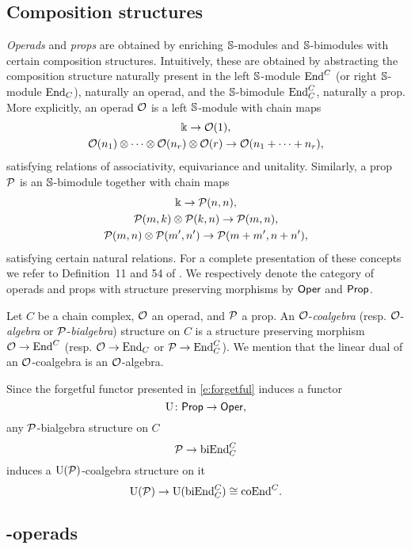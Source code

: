 \subsection{Composition structures}

\textit{Operads} and \textit{props} are obtained by enriching $\mathbb{S}$-modules and $\mathbb{S}$-bimodules with certain composition structures.
Intuitively, these are obtained by abstracting the composition structure naturally present in the left $\mathbb{S}$-module $\mathrm{End}^C$ (or right $\mathbb{S}$-module $\mathrm{End}_C$), naturally an operad, and the $\mathbb{S}$-bimodule $\mathrm{End}^C_C$, naturally a prop.
More explicitly, an operad $\mathcal{O}$ is a left $\mathbb{S}$-module with chain maps
\begin{gather*}
	\Bbbk \to \mathcal{O}(1), \\
	\mathcal{O}(n_1) \otimes \dotsb \otimes \mathcal{O}(n_r) \otimes \mathcal{O}(r) \to \mathcal{O}(n_1 + \dots + n_r),
\end{gather*}
satisfying relations of associativity, equivariance and unitality.
Similarly, a prop $\mathcal{P}$ is an $\mathbb{S}$-bimodule together with chain maps
\begin{gather*}
	\Bbbk \to \mathcal{P}(n,n), \\
	\mathcal{P}(m,k) \otimes \mathcal{P}(k,n) \to \mathcal{P}(m,n), \\
	\mathcal{P}(m,n) \otimes \mathcal{P}(m',n') \to \mathcal{P}(m+m',n+n'),
\end{gather*}
satisfying certain natural relations.
For a complete presentation of these concepts we refer to Definition~11 and 54 of \cite{markl2008props}.
We respectively denote the category of operads and props with structure preserving morphisms by $\mathsf{Oper}$ and $\mathsf{Prop}$.

Let $C$ be a chain complex, $\mathcal{O}$ an operad, and $\mathcal{P}$ a prop.
An $\mathcal{O}$-\textit{coalgebra} (resp. $\mathcal{O}$-\textit{algebra} or $\mathcal{P}$-\textit{bialgebra}) structure on $C$ is a structure preserving morphism $\mathcal{O} \to \mathrm{End}^C$ (resp. $\mathcal{O} \to \mathrm{End}_C$ or $\mathcal{P} \to \mathrm{End}_C^C$).
We mention that the linear dual of an $\mathcal{O}$-coalgebra is an $\mathcal{O}$-algebra.

Since the forgetful functor presented in \cref{e:forgetful} induces a functor
\[
\operatorname{U} \colon \mathsf{Prop} \to \mathsf{Oper},
\]
any $\mathcal{P}$-bialgebra structure on $C$
\[
\mathcal{P} \to \mathrm{biEnd}_C^C
\]
induces a $\operatorname{U}(\mathcal{P})$-coalgebra structure on it
\[
\operatorname{U}(\mathcal{P}) \to \operatorname{U}(\mathrm{biEnd}_C^C) \cong \mathrm{coEnd}^C.
\]

\subsection{\pdfEinfty-operads}

